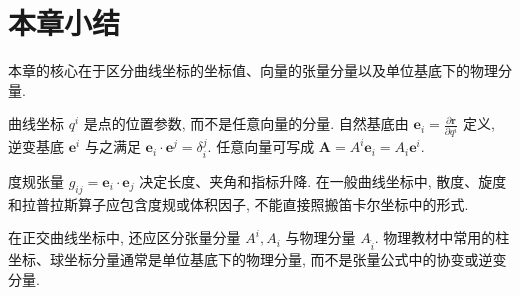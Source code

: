 \section{本章小结}

本章的核心在于区分曲线坐标的坐标值、向量的张量分量以及单位基底下的物理分量. 

曲线坐标 $q^{i}$ 是点的位置参数, 而不是任意向量的分量. 自然基底由 $\bm{e}_{i} = \frac{\partial\bm{r}}{\partial q^{i}}$ 定义, 逆变基底 $\bm{e}^{i}$ 与之满足 $\bm{e}_{i}\cdot\bm{e}^{j}=\delta_{i}^{j}$. 任意向量可写成 $\bm{A}=A^{i}\bm{e}_{i}=A_{i}\bm{e}^{i}$. 

度规张量 $g_{ij}=\bm{e}_{i}\cdot\bm{e}_{j}$ 决定长度、夹角和指标升降. 在一般曲线坐标中, 散度、旋度和拉普拉斯算子应包含度规或体积因子, 不能直接照搬笛卡尔坐标中的形式. 

在正交曲线坐标中, 还应区分张量分量 $A^{i},A_{i}$ 与物理分量 $A_{\hat{i}}$. 物理教材中常用的柱坐标、球坐标分量通常是单位基底下的物理分量, 而不是张量公式中的协变或逆变分量. 
